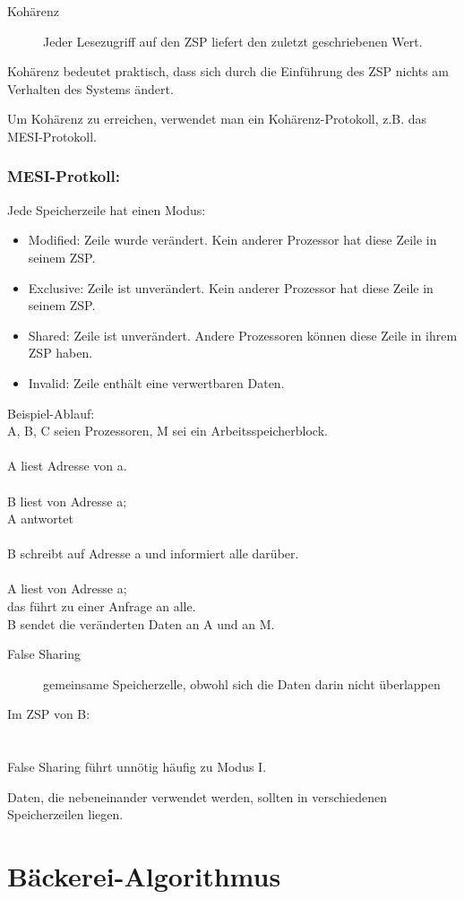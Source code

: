\begin{description}
	\item[Kohärenz] Jeder Lesezugriff auf den ZSP liefert den zuletzt geschriebenen Wert.
\end{description}

Kohärenz bedeutet praktisch, dass sich durch die Einführung des ZSP nichts am Verhalten des Systems ändert.

Um Kohärenz zu erreichen, verwendet man ein Kohärenz-Protokoll, z.B. das MESI-Protokoll.

\subsubsection*{MESI-Protkoll:}

Jede Speicherzeile hat einen Modus:
\begin{itemize}
	\item Modified: Zeile wurde verändert. Kein anderer Prozessor hat diese Zeile in seinem ZSP.
	\item Exclusive: Zeile ist unverändert. Kein anderer Prozessor hat diese Zeile in seinem ZSP.
	\item Shared: Zeile ist unverändert. Andere Prozessoren können diese Zeile in ihrem ZSP haben.
	\item Invalid: Zeile enthält eine verwertbaren Daten.
\end{itemize}
Beispiel-Ablauf:\\
A, B, C seien Prozessoren, M sei ein Arbeitsspeicherblock.\\ %
\\
A liest Adresse von a.\\ %
\\
B liest von Adresse a;\\
A antwortet\\ %
\\
B schreibt auf Adresse a und informiert alle darüber.\\ %
\\
A liest von Adresse a;\\
das führt zu einer Anfrage an alle.\\
B sendet die veränderten Daten an A und an M.

\begin{description}
	\item[False Sharing] gemeinsame Speicherzelle, obwohl sich die Daten darin nicht überlappen
\end{description}

Im ZSP von B:\\ %
\\ %
\\
False Sharing führt unnötig häufig zu Modus I.

Daten, die nebeneinander verwendet werden, sollten in verschiedenen Speicherzeilen liegen.

\section{Bäckerei-Algorithmus}